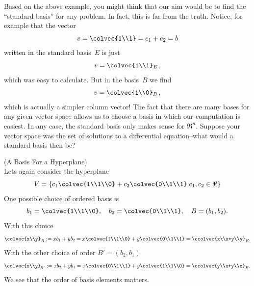 \begin{example}

\end{example}

Based on the above example, you might think that our aim would be to find the ``standard basis'' for any problem. 
In fact, this is far from the truth. Notice, for example that the vector \[v=\colvec{1\\1}=e_1+e_2=b\] written in the standard basis~$E$ is just
\[
v=\colvec{1\\1}_E\, ,
\]
which was easy to calculate. But in the basis~$B$ we find
\[
v=\colvec{1\\0}_B\, ,
\]
which is actually a simpler column vector!
The fact that there are many bases for any given vector space allows us to choose a basis in which our computation is easiest. 
In any case, the standard basis only makes sense for $\Re^n$. Suppose your vector space was the set of solutions to a differential equation--what would a standard basis then be?



\begin{example} (A Basis For a Hyperplane)\\
Lets again consider the hyperplane
\[
V=\left\{  c_1\colvec{1\\1\\0} +c_2\colvec{0\\1\\1} \middle| c_1,c_2\in \Re \right\} 
\]
One possible choice of ordered basis is 
\[b_1=\colvec{1\\1\\0},~~~b_2=\colvec{0\\1\\1}, ~~~
B=(b_1,b_2).
\]
With this choice
\[
\colvec{x\\y}_B := xb_1+ y b_2 
=x\colvec{1\\1\\0}+y \colvec{0\\1\\1}=\ccolvec{x\\x+y\\y}_E.
\]
With the other choice of order $B'=(b_2, b_1)$ 
\[
\colvec{x\\y}_{\!B'} := xb_2+ y b_1 
=x\colvec{0\\1\\1}+y \colvec{1\\1\\0}=\ccolvec{y\\x+y\\x}_E.
\]
We see that the  order of basis elements matters. 
\end{example}

